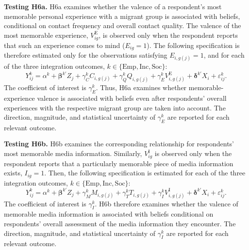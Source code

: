 \noindent\textbf{Testing H6a.} H6a examines whether the valence of a respondent's most memorable personal experience 
with a migrant group is associated with beliefs, conditional on contact frequency and overall contact quality. 
The valence of the most memorable experience, \(V_{ig}^{\mathrm{E}}\), is observed only when the respondent reports 
that such an experience comes to mind (\(E_{ig}=1\)). The following specification is therefore estimated only for the 
observations satisfying \(E_{i,g(j)}=1\), and for each of the three integration outcomes, 
\(k\in\{\mathrm{Emp},\mathrm{Inc},\mathrm{Soc}\}\):
\begin{equation}
Y_{ij}^{k}
=
\alpha^{k}
+ \boldsymbol{\beta}^{k\prime}Z_j
+ \gamma_C^{k}C_{i,g(j)}
+ \gamma_Q^{k}Q_{i,g(j)}
+ \gamma_E^{k}V_{i,g(j)}^{\mathrm{E}}
+ \boldsymbol{\delta}^{k\prime}X_i
+ \varepsilon_{ij}^{k}.
\end{equation}
The coefficient of interest is \(\gamma_E^{k}\). Thus, H6a examines whether memorable-experience valence is associated 
with beliefs even after respondents' overall experiences with the respective migrant group are taken into account. 
The direction, magnitude, and statistical uncertainty of \(\gamma_E^{k}\) are reported for each relevant outcome.\bigskip

\noindent\textbf{Testing H6b.} H6b examines the corresponding relationship for respondents' most memorable media 
information. Similarly, \(V_{ig}^{\mathrm{I}}\) is observed only when the respondent reports that a particularly 
memorable piece of media information exists, \(I_{ig}=1\). Then, the following specification is estimated for each 
of the three integration outcomes, \(k\in\{\mathrm{Emp},\mathrm{Inc},\mathrm{Soc}\}\):
\begin{equation}
Y_{ij}^{k}
=
\alpha^{k}
+ \boldsymbol{\beta}^{k\prime}Z_j
+ \gamma_M^{k}M_{i,g(j)}
+ \gamma_T^{k}T_{i,g(j)}
+ \gamma_I^{k}V_{i,g(j)}^{\mathrm{I}}
+ \boldsymbol{\delta}^{k\prime}X_i
+ \varepsilon_{ij}^{k}.
\end{equation}
The coefficient of interest is \(\gamma_I^{k}\). H6b therefore examines whether the valence of memorable media 
information is associated with beliefs conditional on respondents’ overall assessment of the media information they 
encounter. The direction, magnitude, and statistical uncertainty of \(\gamma_I^{k}\) are reported for each relevant 
outcome.\bigskip

